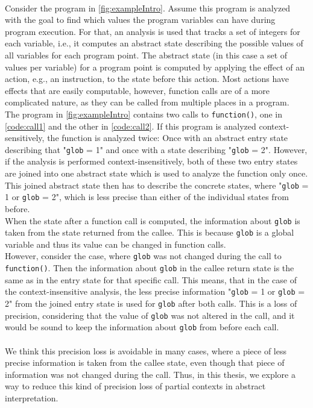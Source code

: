   \\
  Consider the program in \autoref{fig:exampleIntro}. Assume this program is analyzed with the goal to find which values the program variables can have during program execution. For that, an analysis is used that tracks a set of integers for each variable, i.e., it computes an abstract state describing the possible values of all variables for each program point. The abstract state (in this case a set of values per variable) for a program point is computed by applying the effect of an action, e.g., an instruction, to the state before this action. Most actions have effects that are easily computable, however, function calls are of a more complicated nature, as they can be called from multiple places in a program.\\
  The program in \autoref{fig:exampleIntro} contains two calls to \texttt{function()}, one in \autoref{code:call1} and the other in \autoref{code:call2}. If this program is analyzed context-sensitively, the function is analyzed twice: Once with an abstract entry state describing that "\texttt{glob} = 1" and once with a state describing "\texttt{glob} = 2". However, if the analysis is performed context-insensitively, both of these two entry states are joined into one abstract state which is used to analyze the function only once. This joined abstract state then has to describe the concrete states, where "\texttt{glob} = 1 or \texttt{glob} = 2", which is less precise than either of the individual states from before.\\
  When the state after a function call is computed, the information about \texttt{glob} is taken from the state returned from the callee. This is because \texttt{glob} is a global variable and thus its value can be changed in function calls.\\
  However, consider the case, where \texttt{glob} was not changed during the call to \texttt{function()}. Then the information about \texttt{glob} in the callee return state is the same as in the entry state for that specific call. This means, that in the case of the context-insensitive analysis, the less precise information "\texttt{glob} = 1 or \texttt{glob} = 2" from the joined entry state is used for \texttt{glob} after both calls. This is a loss of precision, considering that the value of \texttt{glob} was not altered in the call, and it would be sound to keep the information about \texttt{glob} from before each call.\\
  \\
  We think this precision loss is avoidable in many cases, where a piece of less precise information is taken from the callee state, even though that piece of information was not changed during the call. Thus, in this thesis, we explore a way to reduce this kind of precision loss of partial contexts in abstract interpretation. 

